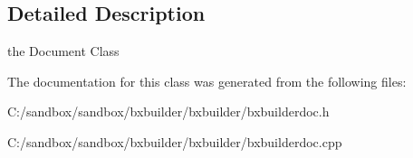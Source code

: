 \subsection{Detailed Description}
the Document Class 

The documentation for this class was generated from the following files:\begin{CompactItemize}
\item 
C:/sandbox/sandbox/bxbuilder/bxbuilder/bxbuilderdoc.h\item 
C:/sandbox/sandbox/bxbuilder/bxbuilder/bxbuilderdoc.cpp\end{CompactItemize}
